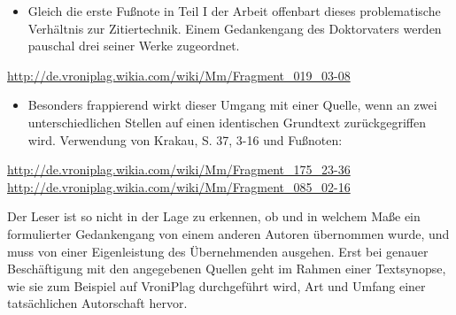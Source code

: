 \documentclass[ngerman,final,fontsize=12pt,paper=a4,twoside,bibliography=totoc,BCOR=8mm,draft=false]{scrartcl}
\begin{document}
\begin{itemize}
\item Gleich die erste Fußnote in Teil I der Arbeit offenbart dieses problematische Verhältnis zur Zitiertechnik. Einem Gedankengang des Doktorvaters werden pauschal drei seiner Werke zugeordnet. 
\end{itemize}
\begin{description}
\item %
\begin{description}
\item  %
\url{http://de.vroniplag.wikia.com/wiki/Mm/Fragment_019_03-08} \end{description}
 \end{description}
\begin{itemize}
\item Besonders frappierend wirkt dieser Umgang mit einer Quelle, wenn an zwei unterschiedlichen Stellen auf einen identischen Grundtext zurückgegriffen wird. Verwendung von Krakau, S. 37, 3-16 und Fußnoten: 
\end{itemize}
\begin{description}
\item %
\begin{description}
\item  %
\url{http://de.vroniplag.wikia.com/wiki/Mm/Fragment_175_23-36} %
\url{http://de.vroniplag.wikia.com/wiki/Mm/Fragment_085_02-16} \end{description}
 \end{description}

Der Leser ist so nicht in der Lage zu erkennen, ob und in welchem Maße ein formulierter Gedankengang von einem anderen Autoren übernommen wurde, und muss von einer Eigenleistung des Übernehmenden ausgehen. Erst bei genauer Beschäftigung mit den angegebenen Quellen geht im Rahmen einer Textsynopse, wie sie zum Beispiel auf VroniPlag durchgeführt wird, Art und Umfang einer tatsächlichen Autorschaft hervor. 
\end{document}
